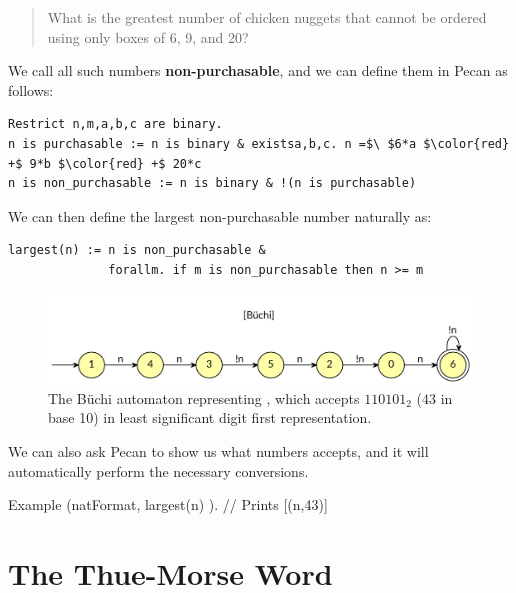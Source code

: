 \documentclass[landscape,usenames,dvipsnames]{sciposter}
\begin{document}
\begin{multicols}{3}

\begin{quote}
    What is the greatest number of chicken nuggets that cannot be ordered using only boxes of 6, 9, and 20?
\end{quote}

We call all such numbers \textbf{non-purchasable}, and we can define them in Pecan as follows:

\begin{lstlisting}[language=pecan, basicstyle=\normalsize\ttfamily, mathescape=true, frame=single]
Restrict n,m,a,b,c are binary.
n is purchasable := n is binary & existsa,b,c. n =$\ $6*a $\color{red} +$ 9*b $\color{red} +$ 20*c
n is non_purchasable := n is binary & !(n is purchasable)
\end{lstlisting}

We can then define the largest non-purchasable number naturally as:
\begin{lstlisting}[language=pecan, basicstyle=\normalsize\ttfamily, mathescape=true, frame=single]
largest(n) := n is non_purchasable & 
              forallm. if m is non_purchasable then n >= m
\end{lstlisting}

\begin{figure}
    \centering
    \includegraphics[width=\textwidth]{images/largest_not_purchasable.pdf}
    \caption{The B\"uchi automaton representing , which accepts $110101_2$ ($43$ in base 10) in least significant digit first representation.}
    \label{fig:largest_non_purchasable}
\end{figure}

We can also ask Pecan to show us what numbers  accepts, and it will automatically perform the necessary conversions.
\begin{pecan}
Example (natFormat, { largest(n) }). // Prints [(n,43)]
\end{pecan}

\columnbreak

\section*{The Thue-Morse Word}


\end{multicols}
\end{document}
